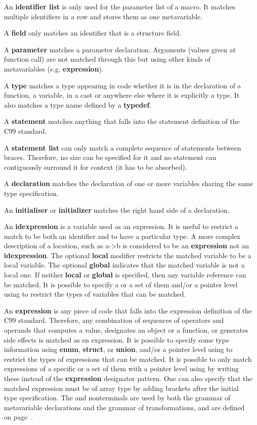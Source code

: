 An {\bf identifier list} is only used for the parameter list of a macro. It
matches multiple identifiers in a row and stores them as one metavariable.

A {\bf field} only matches an identifier that is a structure field.

A {\bf parameter} matches a parameter declaration. Arguments (values given at
function call) are not matched through this but using other kinds of
metavariables (e.g. {\bf expression}).

A {\bf type} matches a type appearing in code whether it is in the declaration
of a function, a variable, in a cast or anywhere else where it is explicitly a
type. It also matches a type name defined by a {\bf typedef}.

A {\bf statement} matches anything that falls into the statement definition of
the C99 standard.

A {\bf statement list} can only match a complete sequence of statements between
braces. Therefore, no size can be specified for it and no statement can
contiguously surround it for context (it has to be absorbed).

A {\bf declaration} matches the declaration of one or more variables sharing
the same type specification.

An {\bf initialiser} or {\bf initializer} matches the right hand side of a
declaration.

An {\bf idexpression} is a variable used as an expression. It is useful to
restrict a match to be both an identifier and to have a particular type.
A more complex description of a location, such as a->b is considered to be an
{\bf expression} not an {\bf idexpression}. The optional {\bf local} modifier
restricts the matched variable to be a local variable. The optional {\bf global}
indicates that the matched variable is not a local one. If neither {\bf local} or
{\bf global} is specified, then any variable reference can be matched.
It is possible to specify a  or a set of them and/or a pointer level
using {\tt *} to restrict the types of variables that can be matched.

An {\bf expression} is any piece of code that falls into the expression
definition of the C99 standard. Therefore, any combination of sequences of
operators and operands that computes a value, designates an object or a
function, or generates side effects is matched as en expression.
It is possible to specify some type information using {\bf enum}, {\bf struct},
or {\bf union}, and/or a pointer level using {\tt *} to restrict the types of
expressions that can be matched.
It is possible to only match expressions of a specific  or a set of
them with a pointer level using {\tt *} by writing these instead of the
{\bf expression} designator pattern. One can also specify that the matched
expression must be of array type by adding brackets after the initial type
specification.
The  and  nonterminals are used by both the grammar of
metavariable declarations and the grammar of transformations, and are
defined on page~\pageref{types}.

